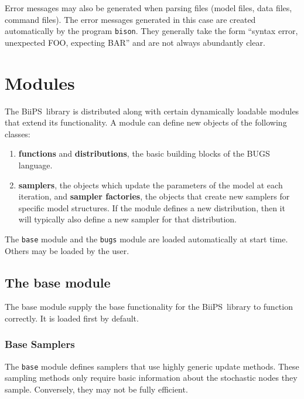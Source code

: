 \documentclass[11pt, a4paper, titlepage]{report}
\newcommand{\biips}{\textsf{BiiPS}}
\begin{document}
Error messages may also be generated when parsing files (model files,
data files, command files).  The error messages generated in this case
are created automatically by the program \texttt{bison}. They
generally take the form ``syntax error, unexpected FOO, expecting BAR''
and are not always abundantly clear.


\chapter{Modules}
\label{section:modules}

The \biips\ library is distributed along with certain dynamically
loadable modules that extend its functionality. A module can define
new objects of the following classes:
\begin{enumerate}
\item {\bf functions} and {\bf distributions}, the basic building
blocks of the BUGS language.
\item {\bf samplers}, the objects which update the parameters of the
model at each iteration, and {\bf sampler factories}, the objects that 
create new samplers for specific model structures.  If the module
defines a new distribution, then it will typically also define a new
sampler for that distribution.
\end{enumerate}

The \verb+base+ module and the \verb+bugs+ module are loaded automatically
at start time.  Others may be loaded by the user.

\section{The base module}

The base module supply the base functionality for the \biips\ library
to function correctly. It is loaded first by default.  

\subsection{Base Samplers}

The \verb+base+ module defines samplers that use highly generic update
methods.  These sampling methods only require basic information about
the stochastic nodes they sample.  Conversely, they may not be fully
efficient.
\end{document}
